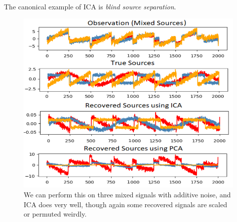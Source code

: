   \begin{example}
    The canonical example of ICA is \textit{blind source separation}. 
    \begin{figure}[H]
      \centering 
      \includegraphics[scale=0.4]{img/ICA_example.png}
      \caption{We can perform this on three mixed signals with additive noise, and ICA does very well, though again some recovered signals are scaled or permuted weirdly. }
    \end{figure}
  \end{example}

